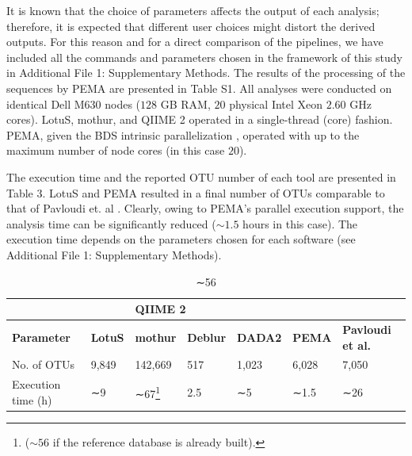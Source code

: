    It is known that the choice of parameters affects the output of each analysis; 
   therefore, it is expected that different user choices might distort the derived outputs. 
   For this reason and for a direct comparison of the pipelines, we have included all the commands and parameters chosen in the framework of this study in Additional File 1: Supplementary Methods. 
   The results of the processing of the sequences by PEMA are presented in Table S1. 
   All analyses were conducted on identical Dell M630 nodes ($128$ GB RAM, $20$ physical Intel Xeon $2.60$ GHz cores). 
   LotuS, mothur, and QIIME 2 operated in a single-thread (core) fashion. 
   PEMA, given the BDS intrinsic parallelization \citep{cingolani2015bigdatascript}, operated with up to the maximum number of node cores (in this case $20$).

   The execution time and the reported OTU number of each tool are presented in Table 3. 
   LotuS and PEMA resulted in a final number of OTUs comparable to that of Pavloudi et. al \citep{pavloudi2017sediment}. 
   Clearly, owing to PEMA's parallel execution support, the analysis time can be significantly reduced ($∼1.5$ hours in this case). 
   The execution time depends on the parameters chosen for each software (see Additional File 1: Supplementary Methods).


   \begin{table}[]
      \begin{tabular}{@{}lllllll@{}}
      \toprule
      \textbf{} & \textbf{} & \multicolumn{2}{l}{\textbf{QIIME 2}} & \textbf{} & \textbf{} &  \\ \midrule
      \textbf{Parameter} & \textbf{LotuS} & \textbf{mothur} & \textbf{Deblur} & \textbf{DADA2} & \textbf{PEMA} & \textbf{Pavloudi et al. \citep{pavloudi2017sediment}} \\
      No. of OTUs & 9,849 & 142,669 & 517 & 1,023 & 6,028 & 7,050 \\
      Execution time (h) & ∼9 & ∼67\footnote{($∼56$ if the reference database is already built).} & 2.5 & ∼5 & ∼1.5 & ∼26 \\ \bottomrule
      \end{tabular}
      \caption{∼56}
   \end{table}

